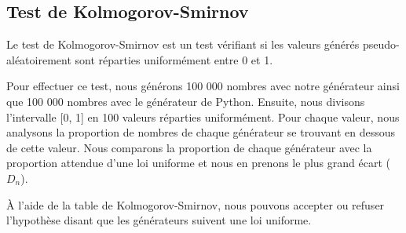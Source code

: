 \documentclass[10pt,a4paper]{article}
\begin{document}
	\newpage
	\subsection{Test de Kolmogorov-Smirnov}
	Le test de Kolmogorov-Smirnov est un test vérifiant si les valeurs générés pseudo-aléatoirement sont réparties uniformément entre 0 et 1.
	
	Pour effectuer ce test, nous générons 100 000 nombres avec notre générateur ainsi que 100 000 nombres avec le générateur de Python.
	Ensuite, nous divisons l'intervalle [0, 1] en 100 valeurs réparties uniformément.
	Pour chaque valeur, nous analysons la proportion de nombres de chaque générateur se trouvant en dessous de cette valeur.
	Nous comparons la proportion de chaque générateur avec la proportion attendue d'une loi uniforme et nous en prenons le plus grand écart ($D_n$).
	
	À l'aide de la table de Kolmogorov-Smirnov, nous pouvons accepter ou refuser l'hypothèse disant que les générateurs suivent une loi uniforme.
	
\end{document}
